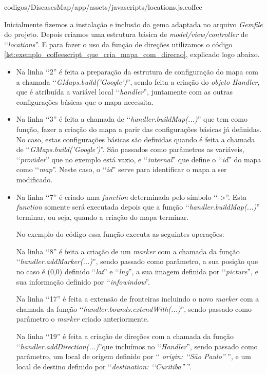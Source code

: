 
{codigos/DiseasesMap/app/assets/javascripts/locations.js.coffee}

Inicialmente fizemos a instalação e inclusão da gema adaptada no arquivo \emph{Gemfile} do projeto. Depois
criamos uma estrutura básica de \emph{model/view/controller} de ‘‘\emph{locations}''. E para fazer o uso
da função de direções utilizamos o código \ref{lst:exemplo_coffeescript_que_cria_mapa_com_direcao},
explicado logo abaixo.

\begin{itemize}

 \item Na linha ‘‘2'' é feita a preparação da estrutura de configuração do mapa com a chamada
 ‘‘\emph{GMaps.build('Google')}'', sendo feita a criação do \emph{objeto Handler}, que é atribuída a
 variável local ‘‘\emph{handler}'', juntamente com as outras configurações básicas que o mapa necessita.

 \item Na linha ‘‘3'' é feita a chamada de ‘‘\emph{handler.buildMap(...)}'' que tem como função, fazer a
 criação do mapa a parir das configurações básicas já definidas. No caso, estas configurações básicas
 são definidas quando é feita a chamada de ‘‘\emph{GMaps.build('Google')}''. São passados como parâmetros
 as variáveis, ‘‘\emph{provider}'' que no exemplo está vazio, e ‘‘\emph{internal}'' que define o ‘‘\emph{id}''
 do mapa como ‘‘\emph{map}''. Neste caso, o ‘‘\emph{id}'' serve para identificar o mapa a ser modificado.

 \item Na linha ‘‘7'' é criado uma \emph{function} determinada pelo símbolo ‘‘->''. Esta \emph{function}
 somente será executada depois que a função ‘‘\emph{handler.buildMap(...)}'' terminar, ou seja, quando a
 criação do mapa terminar.

 No exemplo do código essa função executa as seguintes operações:

  \subitem Na linha ‘‘8'' é feita a criação de um \emph{marker} com a chamada da função
  ‘‘\emph{handler.addMarker(...)}'', sendo passado como parâmetro, a sua posição que no caso é (0,0)
  definido ‘‘\emph{lat}'' e ‘‘\emph{lng}'', a sua imagem definida por ‘‘\emph{picture}'', e sua informação
  definido por ‘‘\emph{infowindow}''.

  \subitem Na linha ‘‘17'' é feita a extensão de fronteiras incluindo o novo \emph{marker} com a chamada
  da função ‘‘\emph{handler.bounds.extendWith(...)}'', sendo passado como parâmetro o \emph{marker} criado
  anteriormente.

  \subitem Na linha ‘‘19'' é feita a criação de direções com a chamada da função
  ‘‘\emph{handler.addDirection(...)}''que incluímos no ‘‘\emph{Handler}'', sendo passado como parâmetro, um
  local de origem definido por ‘‘\emph{ origin: ‘‘São Paulo''} '', e um local de destino definido por
  ‘‘\emph{destination: ‘‘Curitiba''} ''.

\end{itemize}


